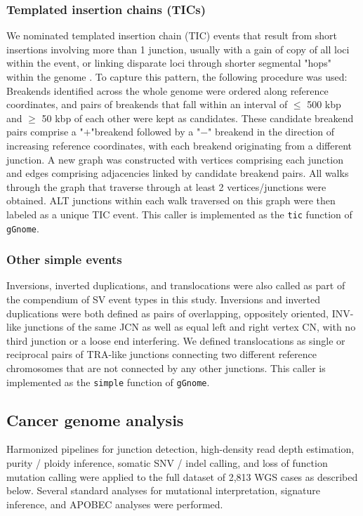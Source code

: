 \documentclass[phd,tocprelim]{cornell}
\newcommand{\ttt}[1]{\texttt{#1}}
\begin{document}
\subsubsection*{Templated insertion chains (TICs)}

We nominated templated insertion chain (TIC) events that result from short insertions involving more than 1 junction, usually with a gain of copy of all loci within the event, or linking disparate loci through shorter segmental "hops" within the genome \cite{Li2020sv}. To capture this pattern, the following procedure was used: Breakends identified across the whole genome were ordered along reference coordinates, and pairs of breakends that fall within an interval of $\le$ 500 kbp and $\ge$ 50 kbp of each other were kept as candidates. These candidate breakend pairs comprise a "$+$"breakend followed by a "$-$" breakend in the direction of increasing reference coordinates, with each breakend originating from a different junction. A new graph was constructed with vertices comprising each junction and edges comprising adjacencies linked by candidate breakend pairs. All walks through the graph that traverse through at least 2 vertices/junctions were obtained. ALT junctions within each  walk traversed on this graph were then labeled as a unique TIC event.  This caller is implemented as the \ttt{tic} function of \ttt{gGnome}.



\subsubsection*{Other simple events}

Inversions, inverted duplications, and translocations were also called as part of the compendium of SV event types in this study. Inversions and inverted duplications were both defined as pairs of overlapping, oppositely oriented, INV-like junctions of the same JCN as well as equal left and right vertex CN, with no third junction or a loose end interfering. We defined translocations as single or reciprocal pairs of TRA-like junctions connecting two different reference chromosomes that are not connected by any other junctions.  This caller is implemented as the \ttt{simple} function of \ttt{gGnome}.

\subsection*{Cancer genome analysis} Harmonized pipelines for junction detection, high-density read depth estimation, purity / ploidy inference, somatic SNV / indel calling, and loss of function mutation calling were applied to the full dataset of 2,813 WGS cases as described below. Several standard analyses for mutational interpretation, signature inference, and APOBEC analyses were performed.
\end{document}
